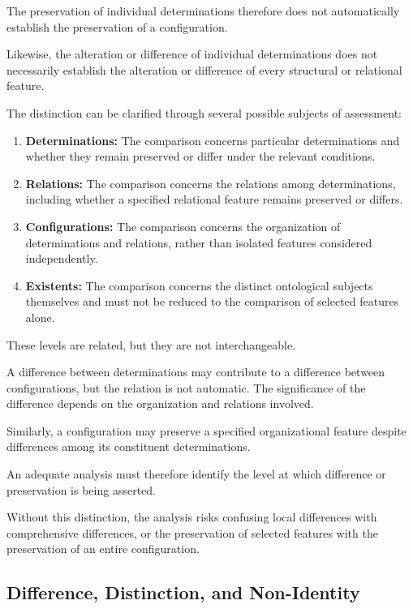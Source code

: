 The preservation of individual determinations
therefore does not automatically establish
the preservation of a configuration.

Likewise, the alteration or difference of
individual determinations does not necessarily
establish the alteration or difference of every
structural or relational feature.

The distinction can be clarified through several
possible subjects of assessment:

\begin{enumerate}
    \item \textbf{Determinations:}
    The comparison concerns particular determinations
    and whether they remain preserved or differ
    under the relevant conditions.

    \item \textbf{Relations:}
    The comparison concerns the relations among
    determinations, including whether a specified
    relational feature remains preserved or differs.

    \item \textbf{Configurations:}
    The comparison concerns the organization of
    determinations and relations, rather than
    isolated features considered independently.

    \item \textbf{Existents:}
    The comparison concerns the distinct ontological
    subjects themselves and must not be reduced
    to the comparison of selected features alone.
\end{enumerate}

These levels are related, but they are not
interchangeable.

A difference between determinations may contribute
to a difference between configurations, but
the relation is not automatic. The significance
of the difference depends on the organization
and relations involved.

Similarly, a configuration may preserve a specified
organizational feature despite differences among
its constituent determinations.

An adequate analysis must therefore identify
the level at which difference or preservation
is being asserted.

Without this distinction, the analysis risks
confusing local differences with comprehensive
differences, or the preservation of selected
features with the preservation of an entire
configuration.

\subsection{Difference, Distinction, and Non-Identity}

